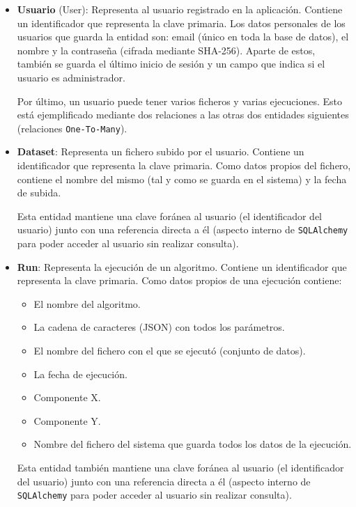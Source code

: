 \begin{itemize}
    \item \textbf{Usuario} (User): Representa al usuario registrado en la
    aplicación. Contiene un identificador que representa la clave primaria. Los
    datos personales de los usuarios que guarda la entidad son: email (único en
    toda la base de datos), el nombre y la contraseña (cifrada mediante
    SHA-256). Aparte de estos, también se guarda el último inicio de sesión y un
    campo que indica si el usuario es administrador.

    Por último, un usuario puede tener varios ficheros y varias ejecuciones.
    Esto está ejemplificado mediante dos relaciones a las otras dos entidades
    siguientes (relaciones \texttt{One-To-Many}).

    \item \textbf{Dataset}: Representa un fichero subido por el usuario.
    Contiene un identificador que representa la clave primaria. Como datos
    propios del fichero, contiene el nombre del mismo (tal y como se guarda en
    el sistema) y la fecha de subida. 

    Esta entidad mantiene una clave foránea al usuario (el identificador del
    usuario) junto con una referencia directa a él (aspecto interno de
    \texttt{SQLAlchemy} para poder acceder al usuario sin realizar consulta).

    \item \textbf{Run}: Representa la ejecución de un algoritmo. Contiene un
    identificador que representa la clave primaria. Como datos propios de una
    ejecución contiene:
    \begin{itemize}
        \item El nombre del algoritmo.
        \item La cadena de caracteres (JSON) con todos los parámetros.
        \item El nombre del fichero con el que se ejecutó (conjunto de datos).
        \item La fecha de ejecución.
        \item Componente X.
        \item Componente Y.
        \item Nombre del fichero del sistema que guarda todos los datos de la ejecución.
    \end{itemize}

    Esta entidad también mantiene una clave foránea al usuario (el identificador
    del usuario) junto con una referencia directa a él (aspecto interno de
    \texttt{SQLAlchemy} para poder acceder al usuario sin realizar consulta).
\end{itemize}

